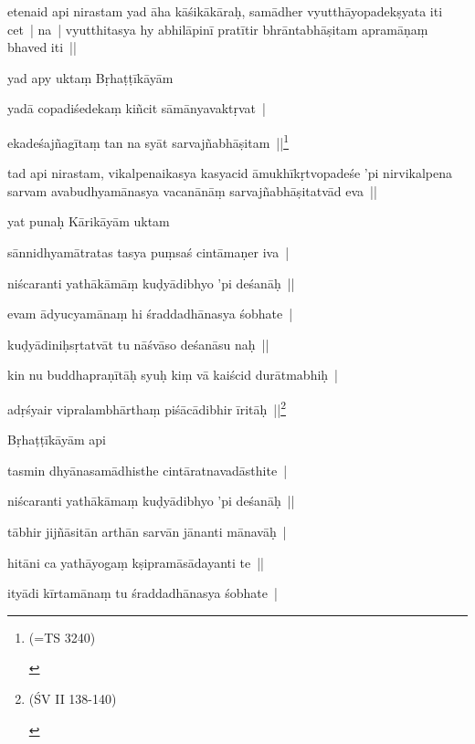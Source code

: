 \documentclass[article,a4paper]{memoir}
\begin{document}
	  \pstart etenaid api nirastam yad ā\-ha kā\-śikā\-kā\-raḥ, samā\-dher vyutthā\-yopadekṣyata iti cet | na | vyutthitasya hy abhilā\-pinī\- pratī\-tir bhrā\-ntabhā\-ṣitam apramā\-ṇaṃ bhaved iti || 
	\pend
      

	  \pstart yad apy uktaṃ Bṛhaṭṭī\-kā\-yā\-m 
	\pend
      

	  \pstart yadā\- copadiśedekaṃ kiñcit sā\-mā\-nyavaktṛvat | 
	\pend
      

	  \pstart ekadeśajñagī\-taṃ tan na syā\-t sarvajñabhā\-ṣitam ||\footnote{\begin{english}(=TS 3240)\end{english}}
	\pend
      

	  \pstart tad api nirastam, vikalpenaikasya kasyacid ā\-mukhī\-kṛtvopadeśe 'pi nirvikalpena sarvam avabudhyamā\-nasya vacanā\-nā\-ṃ sarvajñabhā\-ṣitatvā\-d eva || 
	\pend
      

	  \pstart yat punaḥ Kā\-rikā\-yā\-m uktam 
	\pend
      

	  \pstart sā\-nnidhyamā\-tratas tasya puṃsaś cintā\-maṇer iva | 
	\pend
      

	  \pstart niścaranti yathā\-kā\-mā\-ṃ kuḍyā\-dibhyo 'pi deśanā\-ḥ || 
	\pend
      

	  \pstart evam ā\-dyucyamā\-naṃ hi śraddadhā\-nasya śobhate | 
	\pend
      

	  \pstart kuḍyā\-diniḥsṛtatvā\-t tu nā\-śvā\-so deśanā\-su naḥ || 
	\pend
      

	  \pstart kin nu buddhapraṇī\-tā\-ḥ syuḥ kiṃ vā\- kaiścid durā\-tmabhiḥ | 
	\pend
      

	  \pstart adṛśyair vipralambhā\-rthaṃ piśā\-cā\-dibhir ī\-ritā\-ḥ ||\footnote{\begin{english}(ŚV II 138-140)\end{english}}
	\pend
      

	  \pstart Bṛhaṭṭī\-kā\-yā\-m api 
	\pend
      

	  \pstart tasmin dhyā\-nasamā\-dhisthe cintā\-ratnavadā\-sthite | 
	\pend
      

	  \pstart niścaranti yathā\-kā\-maṃ kuḍyā\-dibhyo 'pi deśanā\-ḥ || 
	\pend
      

	  \pstart tā\-bhir jijñā\-sitā\-n arthā\-n sarvā\-n jā\-nanti mā\-navā\-ḥ | 
	\pend
      

	  \pstart hitā\-ni ca yathā\-yogaṃ kṣipramā\-sā\-dayanti te || 
	\pend
      

	  \pstart ityā\-di kī\-rtamā\-naṃ tu śraddadhā\-nasya śobhate | 
	\pend
      
\end{document}
